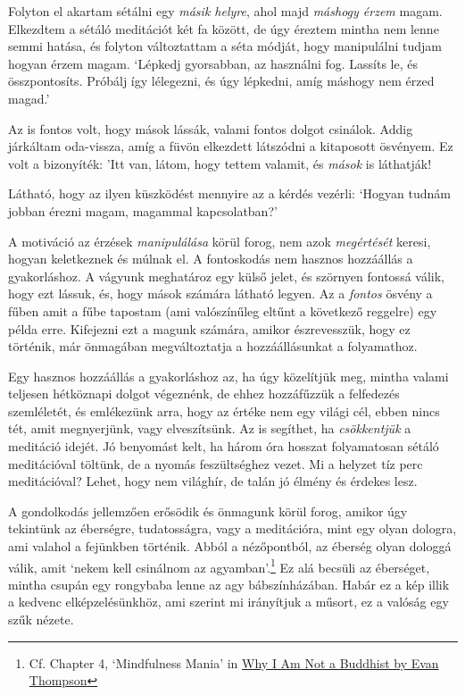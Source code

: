 Folyton el akartam sétálni egy \emph{másik helyre}, ahol majd
\emph{máshogy érzem} magam. Elkezdtem a sétáló meditációt két fa között,
de úgy éreztem mintha nem lenne semmi hatása, és folyton változtattam a
séta módját, hogy manipulálni tudjam hogyan érzem magam. `Lépkedj
gyorsabban, az használni fog. Lassíts le, és összpontosíts. Próbálj így
lélegezni, és úgy lépkedni, amíg máshogy nem érzed magad.'

Az is fontos volt, hogy mások lássák, valami fontos dolgot csinálok.
Addig járkáltam oda-vissza, amíg a füvön elkezdett látszódni a
kitaposott ösvényem. Ez volt a bizonyíték: 'Itt van, látom, hogy tettem
valamit, és \emph{mások} is láthatják!

Látható, hogy az ilyen küszködést mennyire az a kérdés vezérli: `Hogyan
tudnám jobban érezni magam, magammal kapcsolatban?'

A motiváció az érzések \emph{manipulálása} körül forog, nem azok
\emph{megértését} keresi, hogyan keletkeznek és múlnak el. A fontoskodás
nem hasznos hozzáállás a gyakorláshoz. A vágyunk meghatároz egy külső
jelet, és szörnyen fontossá válik, hogy ezt lássuk, és, hogy mások
számára látható legyen. Az a \emph{fontos} ösvény a fűben amit a fűbe
tapostam (ami valószínűleg eltűnt a következő reggelre) egy példa erre.
Kifejezni ezt a magunk számára, amikor észrevesszük, hogy ez történik,
már önmagában megváltoztatja a hozzáállásunkat a folyamathoz.

Egy hasznos hozzáállás a gyakorláshoz az, ha úgy közelítjük meg, mintha
valami teljesen hétköznapi dolgot végeznénk, de ehhez hozzáfűzzük a
felfedezés szemléletét, és emlékezünk arra, hogy az értéke nem egy
világi cél, ebben nincs tét, amit megnyerjünk, vagy elveszítsünk. Az is
segíthet, ha \emph{csökkentjük} a meditáció idejét. Jó benyomást kelt,
ha három óra hosszat folyamatosan sétáló meditációval töltünk, de a
nyomás feszültséghez vezet. Mi a helyzet tíz perc meditációval? Lehet,
hogy nem világhír, de talán jó élmény és érdekes lesz.


A gondolkodás jellemzően erősödik és önmagunk körül forog, amikor úgy
tekintünk az éberségre, tudatosságra, vagy a meditációra, mint egy olyan
dologra, ami valahol a fejünkben történik. Abból a nézőpontból, az
éberség olyan dologgá válik, amit `nekem kell csinálnom az
agyamban'.\footnote{Cf. Chapter 4, `Mindfulness Mania' in
  \href{https://www.goodreads.com/book/show/44439993-why-i-am-not-a-buddhist}{Why
  I Am Not a Buddhist by Evan Thompson}} Ez alá becsüli az éberséget,
mintha csupán egy rongybaba lenne az agy bábszínházában. Habár ez a kép
illik a kedvenc elképzelésünkhöz, ami szerint mi irányítjuk a műsort, ez
a valóság egy szűk nézete.

